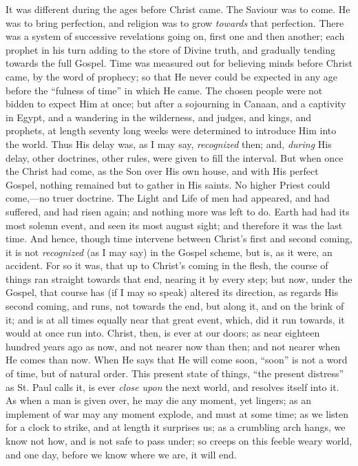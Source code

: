 It was different during the ages before Christ came. The Saviour
was to come. He was to bring perfection, and religion was to grow \emph{towards}
that perfection. There was a system of successive revelations going
on, first one and then another; each prophet in his turn adding to the
store of Divine truth, and gradually tending towards the full Gospel.
Time was measured out for believing minds before Christ came, by the
word of prophecy; so that He never could be expected in any age before
the ``fulness of time'' in which He came. The chosen people
were not bidden to expect Him at once; but after a sojourning in
Canaan, and a captivity in Egypt, and a wandering in the wilderness,
and judges, and kings, and prophets, at length seventy long weeks were
determined to introduce Him into the world. Thus His delay was, as I
may say, \emph{recognized} then; and, \emph{during} His delay, other
doctrines, other rules, were given to fill the interval. But when once
the Christ had come, as the Son over His own house, and with His
perfect Gospel, nothing remained but to gather in His saints. No
higher Priest could come,—no truer doctrine. The Light and Life of
men had appeared, and had suffered, and had risen again; and nothing
more was left to do. Earth had had its most solemn event, and seen its
most august sight; and therefore it was the last time. And hence,
though time intervene between Christ's first and second coming, it is
not \emph{recognized} (as I may say) in the Gospel scheme, but is, as
it were, an accident. For so it was, that up to Christ's coming in the
flesh, the course of things ran straight towards that end, nearing it
by every step; but now, under the Gospel, that course has (if I may so
speak) altered its direction, as regards His second coming, and runs,
not towards the end, but along it, and on the brink of it; and is at
all times equally near that great event, which, did it run towards, it
would at once run into. Christ, then, is ever at our doors; as near
eighteen hundred years ago as now, and not nearer now than then; and
not nearer when He comes than now. When He says that He will come
soon, ``soon'' is not a word of time, but of natural order.
This present state of things, ``the present distress'' as St.
Paul calls it, is ever \emph{close upon} the next world, and resolves
itself into it. As when a man is given over, he may die any moment,
yet lingers; as an implement of war may any moment explode, and must
at some time; as we listen for a clock to strike, and at length it
surprises us; as a crumbling arch hangs, we know not how, and is not
safe to pass under; so creeps on this feeble weary world, and one day,
before we know where we are, it will end.

